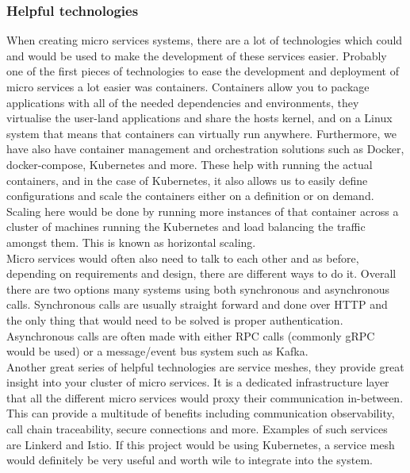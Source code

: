 \documentclass{article}
\newcommand{\vspaceconst}{-2ex}
\begin{document}
\begin{multicols}{2}
\subsubsection{Helpful technologies}
\vspace{\vspaceconst}

  When creating micro services systems, there are a lot of technologies which could and would be used to make the development of these services easier. Probably one of the first pieces of technologies to ease the development and deployment of micro services a lot easier was containers. Containers allow you to package applications with all of the needed dependencies and environments, they virtualise the user-land applications and share the hosts kernel, and on a Linux system that means that containers can virtually run anywhere. Furthermore, we have also have container management and orchestration solutions such as Docker\cite{Docker}, docker-compose\cite{Docker}, Kubernetes\cite{k8s} and more. These help with running the actual containers, and in the case of Kubernetes, it also allows us to easily define configurations and scale the containers either on a definition or on demand. Scaling here would be done by running more instances of that container across a cluster of machines running the Kubernetes and load balancing the traffic amongst them. This is known as horizontal scaling.\\
Micro services would often also need to talk to each other and as before, depending on requirements and design, there are different ways to do it. Overall there are two options many systems using both synchronous and asynchronous calls. Synchronous calls are usually straight forward and done over HTTP and the only thing that would need to be solved is proper authentication. Asynchronous calls are often made with either RPC calls (commonly gRPC\cite{grpc} would be used) or a message/event bus system such as Kafka\cite{kafka}.\\
  Another great series of helpful technologies are service meshes, they provide great insight into your cluster of micro services. It is a dedicated infrastructure layer that all the different micro services would proxy their communication in-between. This can provide a multitude of benefits including communication observability, call chain traceability, secure connections and more. Examples of such services are Linkerd\cite{linkerd} and Istio\cite{istio}. If this project would be using Kubernetes, a service mesh would definitely be very useful and worth wile to integrate into the system.\\


\end{multicols}
\end{document}
